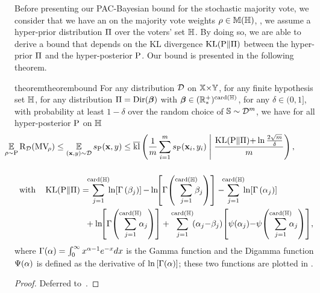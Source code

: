 Before presenting our PAC-Bayesian bound for the stochastic majority vote, we consider that we have an \apriori on the majority vote weights $\rho\in\mathbb{M}(\mathbb{H})$, \ie, we assume a hyper-prior distribution $\Pi$ over the voters' set $\mathbb{H}$.
By doing so, we are able to derive a bound that depends on the KL divergence $\operatorname{KL}(\mathrm{P}\|\Pi)$ between the hyper-prior $\Pi$ and the hyper-posterior $\mathrm{P}$.
Our bound is presented in the following theorem.

\begin{restatable}{theorem}{theorembound}\label{chap:mv-sto:theorem:bound}
For any distribution $\mathcal{D}$ on $\mathbb{X}{\times}\mathbb{Y}$, for any finite hypothesis set $\mathbb{H}$, for any distribution $\Pi=\textrm{Dir}(\boldsymbol{\beta})$ with $\boldsymbol{\beta}\in(\mathbb{R}^{+}_{*})^{\operatorname{card}(\mathbb{H})}$, for any $\delta \in (0, 1]$, with probability at least $1-\delta$ over the random choice of $\mathbb{S}\sim\mathcal{D}^m$, we have for all hyper-posterior $\mathrm{P}$ on $\mathbb{H}$ 
\begin{align*}
    &\hspace{-3.2cm}\EE_{\Q\sim\hyperQ}\Risk_{\D}(\MVQ) \le \EE_{(\x,\y)\sim\D}s_{\hyperQ}(\x, \y) \le \klmax\LP \frac{1}{\m}\sum_{i=1}^\m s_{\hyperQ}(\x_i, \y_i) \;\middle|\; \frac{\KL(\hyperQ\|\hyperP){+}\ln\frac{2\sqrt{m}}{\delta}}{\m}\RP,\\[0.5cm]
    \text{with}\quad \KL(\hyperQ\|\hyperP)&=\!\!\!\sum_{j=1}^{\card(\H)}\!\!\ln\!\LB\Gamma\LP\sparamDirP_j\RP\RB{-}\ln\!\!\LB\Gamma\!\LP\sum_{j=1}^{\card(\H)}\!\!\!\sparamDirP_j\RP\RB -\!\!\!\sum_{j=1}^{\card(\H)}\!\!\ln\!\LB\Gamma\LP\sparamDir_j\RP\RB \\
    &\hspace{0.2cm}+\ln\!\!\LB\Gamma\!\LP\sum_{j=1}^{\card(\H)}\!\!\!\sparamDir_j\RP\RB + \sum_{j=1}^{\card(\H)}\!(\sparamDir_j{-}\sparamDirP_j)\!\LB\psi(\sparamDir_j){-}\psi\!\LP\sum_{j=1}^{\card(\H)}\!\!\!\sparamDir_j\RP\RB\!,
\end{align*}
where $\Gamma(\alpha) = \int_{0}^{\infty}x^{\alpha-1}e^{-x}dx$ is the Gamma function and the Digamma function $\Psi(\alpha)$ is defined as the derivative of $\ln\left[\Gamma(\alpha)\right]$; these two functions are plotted in .
\end{restatable}
\begin{noaddcontents}\begin{proof}
Deferred to~.
\end{proof}\end{noaddcontents}

